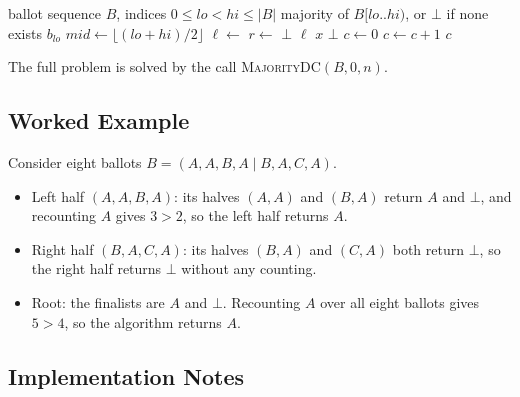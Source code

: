 \documentclass[conference]{IEEEtran}
\newcommand{\Eq}{\textsc{Eq}}
\begin{document}
\begin{algorithm}[t]
\caption{Divide-and-conquer majority verification}
\label{alg:dc}
\begin{algorithmic}[1]
\Require ballot sequence $B$, indices $0 \le lo < hi \le |B|$
\Ensure majority of $B[lo..hi)$, or $\bot$ if none exists
    \State \Return $b_{lo}$ 
  \EndIf
  \State $mid \gets \lfloor (lo + hi)/2 \rfloor$ 
  \State $\ell \gets$  
  \State $r \gets$ 
   
    \State \Return $\bot$
  \EndIf
  \If{$\ell \ne \bot$ \textbf{and} $r \ne \bot$ \textbf{and} $\Eq(\ell, r)$}
    \State \Return $\ell$
  \EndIf
      \State \Return $x$
    \EndIf
  \EndFor
  \State \Return $\bot$
\EndFunction
\Statex
{}
  \State $c \gets 0$
    \If{$\Eq(b_i, x)$}
      \State $c \gets c + 1$
    \EndIf
  \EndFor
  \State \Return $c$
\EndFunction
\end{algorithmic}
\end{algorithm}

The full problem is solved by the call \textsc{MajorityDC}$(B, 0, n)$.

\subsection{Worked Example}

Consider eight ballots $B = (A, A, B, A \mid B, A, C, A)$.
\begin{itemize}
  \item Left half $(A, A, B, A)$: its halves $(A, A)$ and $(B, A)$ return
        $A$ and $\bot$, and recounting $A$ gives $3 > 2$, so the left half
        returns $A$.
  \item Right half $(B, A, C, A)$: its halves $(B, A)$ and $(C, A)$ both
        return $\bot$, so the right half returns $\bot$ without any counting.
  \item Root: the finalists are $A$ and $\bot$. Recounting $A$ over all eight
        ballots gives $5 > 4$, so the algorithm returns $A$.
\end{itemize}

\subsection{Implementation Notes}
\end{document}
